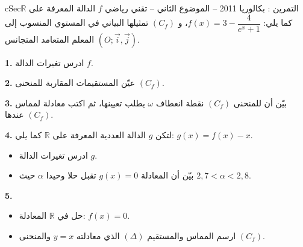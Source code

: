 \documentclass[12pt,a4paper]{article}
\newenvironment{BOX}[2]{\begin{otherlanguage}{english}\begin{arbox}{#1}{#2}}{\end{arbox}\end{otherlanguage}}
\newcounter{exo}
\newenvironment{tamrin}[1]{\stepcounter{exo}\begin{BOX}{cSec}{التمرين \theexo: #1}}{\end{BOX}}
\newcommand{\R}{\mathbb{R}}
\newenvironment{sq}{\begin{itemize}[leftmargin=2.4em,itemsep=3pt]}{\end{itemize}}
\newcommand{\qa}{\item[(أ)]}\newcommand{\qb}{\item[(ب)]}\newcommand{\qc}{\item[(جـ)]}\newcommand{\qd}{\item[(د)]}\newcommand{\qe}{\item[(هـ)]}
\newcommand{\QQ}[1]{\par\smallskip\textbf{#1.} }
\begin{document}
\begin{tamrin}{بكالوريا 2011 -- الموضوع الثاني -- تقني رياضي}
$f$ الدالة المعرفة على $\R$ كما يلي: $f(x)=3-\dfrac{4}{e^{x}+1}$،
و $(C_f)$ تمثيلها البياني في المستوي المنسوب إلى المعلم المتعامد المتجانس $(O;\vec i,\vec j)$.
\QQ{1} ادرس تغيرات الدالة $f$.
\QQ{2} عيّن المستقيمات المقاربة للمنحنى $(C_f)$.
\QQ{3} بيّن أن للمنحنى $(C_f)$ نقطة انعطاف $\omega$ يطلب تعيينها، ثم اكتب معادلة لمماس $(C_f)$ عندها.
\QQ{4} لتكن $g$ الدالة العددية المعرفة على $\R$ كما يلي: $g(x)=f(x)-x$.
\begin{sq}
\qa ادرس تغيرات الدالة $g$.
\qb بيّن أن المعادلة $g(x)=0$ تقبل حلا وحيدا $\alpha$ حيث $2{,}7<\alpha<2{,}8$.
\end{sq}
\QQ{5}
\begin{sq}
\qa حل في $\R$ المعادلة: $f(x)=0$.
\qb ارسم المماس والمستقيم $(\Delta)$ الذي معادلته $y=x$ والمنحنى $(C_f)$.
\end{sq}
\end{tamrin}
\end{document}
